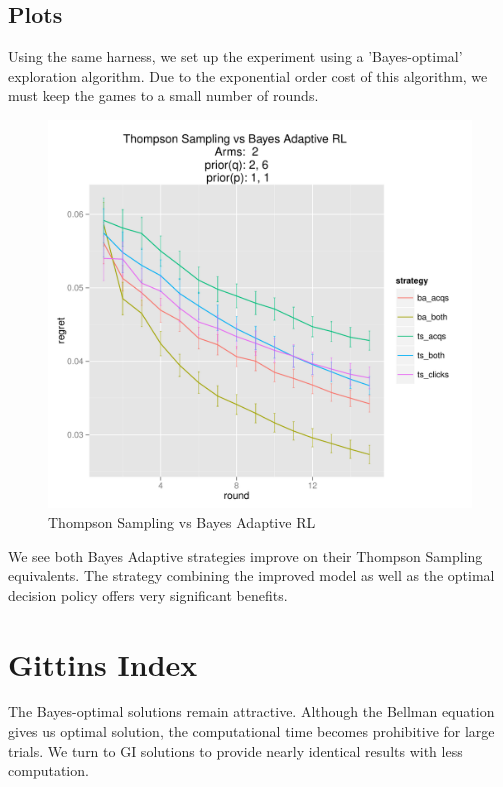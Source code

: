 \documentclass[11pt,a4,singlespacing,titlepagenumber=on]{scrreprt}
\numberwithin{equation}{chapter} %
\theoremstyle{remark}
\begin{document}
\subsection{Plots}

Using the same harness, we set up the experiment using a 'Bayes-optimal' exploration algorithm. Due to the exponential order cost of this algorithm, we must keep the games to a small number of rounds. 

\begin{figure}[p]
    \centering
    \includegraphics[scale=0.9]{TSvsBARL.pdf}
    \caption{ Thompson Sampling vs Bayes Adaptive RL }
\end{figure}



We see both Bayes Adaptive strategies improve on their Thompson Sampling equivalents. The strategy combining the improved model as well as the optimal decision policy offers very significant benefits.


\section{Gittins Index}

The Bayes-optimal solutions remain attractive. Although the Bellman equation gives us optimal solution, the computational time becomes prohibitive for large trials. We turn to GI solutions to provide nearly identical results with less computation.
\end{document}
